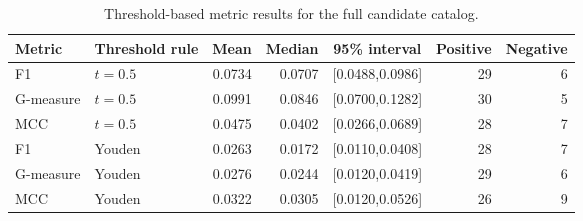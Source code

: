 \documentclass[referee]{USG}
\begin{document}
\begin{table}[h]
\caption{Threshold-based metric results for the full candidate catalog.}
\label{tab:threshold_metrics}
\centering\small
\setlength{\tabcolsep}{4pt}
\begin{tabular}{llrrcrr}
\toprule
Metric & Threshold rule & Mean & Median & 95\% interval & Positive & Negative\\
\midrule
F1 & $t=0.5$ & 0.0734 & 0.0707 & [0.0488,0.0986] & 29 & 6\\
G-measure & $t=0.5$ & 0.0991 & 0.0846 & [0.0700,0.1282] & 30 & 5\\
MCC & $t=0.5$ & 0.0475 & 0.0402 & [0.0266,0.0689] & 28 & 7\\
F1 & Youden & 0.0263 & 0.0172 & [0.0110,0.0408] & 28 & 7\\
G-measure & Youden & 0.0276 & 0.0244 & [0.0120,0.0419] & 29 & 6\\
MCC & Youden & 0.0322 & 0.0305 & [0.0120,0.0526] & 26 & 9\\
\bottomrule
\end{tabular}
\end{table}
\end{document}

